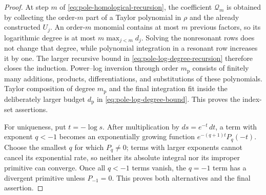 \documentclass[11pt]{amsart}
\numberwithin{equation}{section}
\theoremstyle{definition}
\theoremstyle{remark}
\begin{document}
\begin{proof}
At step $m$ of \eqref{eq:pole-homological-recursion}, the coefficient
$\mathcal Q_m$ is obtained by collecting the order-$m$ part of a Taylor
polynomial in $\rho$ and the already constructed $U_j$.  An order-$m$
monomial contains at most $m$ previous factors, so its logarithmic degree
is at most $m\max_{j<m}d_j$.  Solving the nonresonant rows does not change
that degree, while polynomial integration in a resonant row increases it
by one.  The larger recursive bound in
\eqref{eq:pole-log-degree-recursion} therefore closes the induction.
Power--log inversion through order $m_{\mathrm p}$ consists of finitely
many additions, products, differentiations, and substitutions of these
polynomials.  Taylor composition of degree $m_{\mathrm p}$ and the final
integration fit inside the deliberately larger budget $d_{\mathrm p}$ in
\eqref{eq:pole-log-degree-bound}.  This proves the index-set assertions.

For uniqueness, put $t=-\log s$.  After multiplication by
$ds=e^{-t}\,dt$, a term with exponent $q<-1$ becomes an exponentially
growing function $e^{-(q+1)t}P_q(-t)$.  Choose the smallest $q$ for which
$P_q\ne0$; terms with larger exponents cannot cancel its exponential
rate, so neither its absolute integral nor its improper primitive can
converge.  Once all $q<-1$ terms vanish, the $q=-1$ term has a divergent
primitive unless $P_{-1}=0$.  This proves both alternatives and the final
assertion.
\end{proof}
\end{document}
